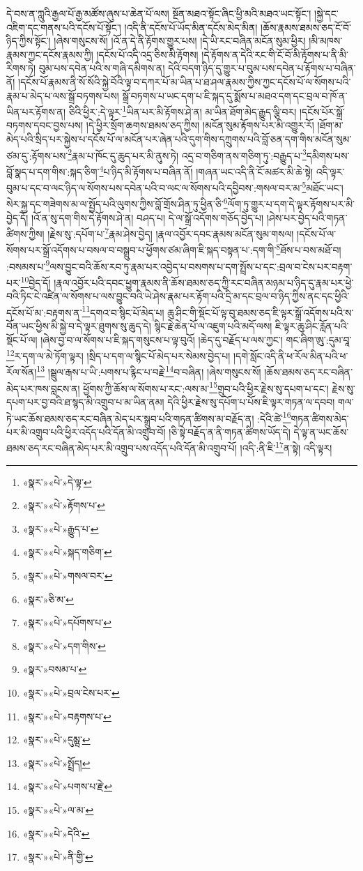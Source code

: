དེ་བས་ན་ཀླུའི་རྒྱལ་པོ་རྒྱ་མཚོས་ཞུས་པ་ཆེན་པོ་ལས། སྔོན་མཐའ་སྟོང་ཞིང་ཕྱི་མའི་མཐའ་ཡང་སྟོང་། །སྐྱེ་དང་འཇིག་དང་གནས་པའི་དངོས་པོ་སྟོང་། །འདི་ནི་དངོས་པོ་ཡོད་མིན་དངོས་མེད་མིན། །ཆོས་རྣམས་ཐམས་ཅད་ངོ་བོ་ཉིད་ཀྱིས་སྟོང་། །ཞེས་གསུངས་སོ། །འོ་ན་དེ་ནི་རྟོགས་གྱུར་པས། །དེ་ཡི་རང་བཞིན་མངོན་སུམ་ཕྱིར། །མི་མཁས་རྣམས་ཀྱང་དངོས་རྣམས་ཀྱི། །དངོས་པོ་འདི་འདྲ་ཅིས་མི་རྟོགས། །དེ་རྟོགས་ན་དེའི་རང་གི་ངོ་བོ་མི་རྟོགས་པ་ནི་མི་རིགས་ཏེ། བུམ་པས་དབེན་པའི་ས་གཞི་དམིགས་ན། དེའི་བདག་ཉིད་དུ་གྱུར་པ་བུམ་པས་དབེན་པ་རྟོགས་པ་བཞིན་ནོ། །དངོས་པོ་རྣམས་ནི་སོ་སོའི་སྐྱེ་བོའི་ལྟ་བ་དཀར་པོ་མ་ཡིན་པ་ཐ་ཤལ་རྣམས་ཀྱིས་ཀྱང་དངོས་པོ་ལ་སོགས་པའི་རྣམ་པ་མེད་པ་ལས་སྒྲོ་བཏགས་པས། སྒྲོ་བཏགས་པ་ཡང་དག་པ་ཇི་སྐད་དུ་སྨོས་པ་མཐའ་དག་དང་བྲལ་བ་ཁོ་ན་ཡིན་པར་རྟོགས་ན། ཅིའི་ཕྱིར་:དེ་ལྟར་\footnote{«སྣར་»«པེ་»དེ་ལྟ་}ཡིན་པར་མི་རྟོགས་ཤེ་ན། མ་ཡིན་ཐོག་མེད་རྒྱུད་ལྕི་བར། །དངོས་པོར་སྒྲོ་བཏགས་དབང་བྱས་པས། །དེ་ཕྱིར་སྲོག་ཆགས་ཐམས་ཅད་ཀྱིས། །མངོན་སུམ་རྟོགས་པར་མི་འགྱུར་རོ། །ཐོག་མ་མེད་པའི་སྲིད་པར་སྐྱེས་པ་དངོས་པོ་ལ་མངོན་པར་ཞེན་པའི་དུག་གིས་དཀྲུགས་པའི་བློ་ཅན་དག་གིས་མངོན་སུམ་ཙམ་དུ་:རྟོགས་པས་\footnote{«སྣར་»«པེ་»རྟོགས་པ་}རྣམ་པ་ཁོང་དུ་ཆུད་པར་མི་ནུས་ཏེ། འདྲ་བ་གཅིག་ནས་གཅིག་ཏུ་:བརྒྱུད་པ་\footnote{«སྣར་»«པེ་»རྒྱུད་པ་}དམིགས་པས་བློ་སྣད་པ་དག་གིས་:སྐད་ཅིག་\footnote{«སྣར་»«པེ་»སྐད་གཅིག་}པ་ཉིད་མི་རྟོགས་པ་བཞིན་ནོ། །གཞན་ཡང་འདི་ནི་ངོ་མཚར་མི་ཆེ་སྟེ། འདི་ལྟར་བུམ་པ་དང་བ་ལང་ཉིད་ལ་སོགས་པས་དབེན་པའི་བ་ལང་ལ་སོགས་པའི་དབྱིབས་:གསལ་བར་མ་\footnote{«སྣར་»«པེ་»གསལ་བར་}མཐོང་ཡང་། སེར་སྐྱ་དང་གཟེགས་མ་ལ་སྤྱོད་པའི་ལུགས་ཀྱིས་བློ་གྲོས་ཤིན་ཏུ་ཕྱིན་ཅི་\footnote{«སྣར་»ཅི་མ་}ལོག་ཏུ་གྱུར་པ་དག་དེ་ལྟར་རྟོགས་པར་མི་བྱེད་དོ། །འོ་ན་སུ་དག་གིས་དེ་རྟོགས་ཤེ་ན། བཤད་པ། དེ་ལ་སྒྲོ་འདོགས་གཅོད་བྱེད་པ། །ཤེས་པར་བྱེད་པའི་གཏན་ཚིགས་ཀྱིས། །རྗེས་སུ་:དཔོག་པ་\footnote{«སྣར་»«པེ་»དཔོགས་པ་}རྣམ་ཤེས་བྱེད། །རྣལ་འབྱོར་དབང་རྣམས་མངོན་སུམ་གསལ། །དངོས་པོ་ལ་སོགས་པར་སྒྲོ་འདོགས་པ་བསལ་བ་བསྒྲུབ་པ་ཕྱོགས་ཙམ་ཞིག་ཇི་སྐད་བསྟན་པ་:དག་གི་\footnote{«སྣར་»«པེ་»དག་གིས་}ཐོས་པ་བས་མཐོ་བ། :བསམས་པ་\footnote{«སྣར་»བསམ་པ་}ལས་བྱུང་བའི་ཆོས་རབ་ཏུ་རྣམ་པར་འབྱེད་པ་བསགས་པ་དག་སྤྲོས་པ་དང་:བྲལ་བ་ངེས་པར་བརྟག་པར་\footnote{«སྣར་»«པེ་»བྲལ་ངེས་པར་}བྱེད་དོ། །རྣལ་འབྱོར་པའི་དབང་ཕྱུག་རྣམས་ནི་ཆོས་ཐམས་ཅད་ཀྱི་རང་བཞིན་མཉམ་པ་ཉིད་དུ་རྣམ་པར་ཕྱེ་བའི་ཏིང་ངེ་འཛིན་ལ་སོགས་པ་ལས་བྱུང་བའི་ཡེ་ཤེས་རྣམ་པར་རྟོག་པའི་དྲི་མ་དང་བྲལ་བ་ཉིད་ཀྱིས་ནང་དང་ཕྱིའི་དངོས་པོ་མ་:བརྟགས་ན་\footnote{«སྣར་»«པེ་»བརྟགས་པ་}དགའ་བ་སྙིང་པོ་མེད་པ། ཆུ་ཤིང་གི་སྡོང་པོ་ལྟ་བུ་ཐམས་ཅད་ཇི་ལྟར་སྒྲོ་འདོགས་པའི་ས་བོན་ཡང་ཕྱིས་མི་སྐྱེ་བ་དེ་ལྟར་ཐུགས་སུ་ཆུད་དེ། སྙིང་རྗེ་ཆེན་པོ་ལ་འཇུག་པའི་མདོ་ལས། ཇི་ལྟར་ཆུ་ཤིང་རློན་པའི་སྡོང་པོ་ལ། །ཞེས་བྱ་བ་ལ་སོགས་པ་ཇི་སྐད་གསུངས་པ་ལྟ་བུའོ། །ཆེད་དུ་བརྗོད་པ་ལས་ཀྱང་། གང་ཞིག་ཨུ་:དུམ་བཱ་\footnote{«སྣར་»«པེ་»དུམྺ་}ར་དག་ལ་མེ་ཏོག་ལྟར། །སྲིད་པ་དག་ལ་སྙིང་པོ་མེད་པར་སེམས་བྱེད་པ། །དགེ་སློང་འདི་ནི་ཕ་རོལ་མིན་པའི་ཕ་རོལ་སོན།\footnote{«སྣར་»«པེ་»སྤྲོད།} །སྦྲུལ་རྒས་པ་ཡི་:པགས་པ་རྙིང་པ་བརྗེ་\footnote{«སྣར་»«པེ་»པགས་པ་རྗེ་}བ་བཞིན། །ཞེས་གསུངས་སོ། །ཆོས་ཐམས་ཅད་རང་བཞིན་མེད་པར་ཁས་བླངས་ན། ཕྱོགས་ཀྱི་ཆོས་ལ་སོགས་པ་རང་:ལས་མ་\footnote{«སྣར་»«པེ་»ལ་མ་}གྲུབ་པའི་ཕྱིར་རྗེས་སུ་དཔག་པ་དང་། རྗེས་སུ་དཔག་པར་བྱ་བའི་ཐ་སྙད་མི་འགྲུབ་པ་མ་ཡིན་ནམ། དེའི་ཕྱིར་རྗེས་སུ་དཔོག་པ་པོས་ཇི་ལྟར་གཏན་ལ་དབབ། གལ་ཏེ་ཡང་ཆོས་ཐམས་ཅད་རང་བཞིན་མེད་པར་སྒྲུབ་པའི་གཏན་ཚིགས་མ་བརྗོད་ན། :དེའི་ཚེ་\footnote{«སྣར་»«པེ་»དེའི་}གཏན་ཚིགས་མེད་པར་མི་འགྲུབ་པའི་ཕྱིར་འདོད་པའི་དོན་མི་འགྲུབ་བོ། །ཅི་སྟེ་བརྗོད་ན་ནི་གཏན་ཚིགས་ཡོད་དེ། དེ་ལྟ་ན་ཡང་ཆོས་ཐམས་ཅད་རང་བཞིན་མེད་པར་མི་འགྲུབ་པས་འདོད་པའི་དོན་མི་འགྲུབ་པོ། །འདི་:ནི་ཇི་\footnote{«སྣར་»«པེ་»ནི་གྱི་}ན་སྟེ། འདི་ལྟར། 